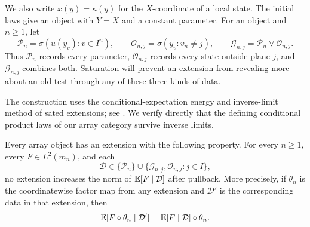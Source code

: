 We also write $x(y)=\kappa(y)$ for the $X$-coordinate of a local state.
The initial laws give an object with $Y=X$ and a constant parameter.
For an object and $n\geq1$, let
\[
 \mathcal P_n=\sigma(u(y_v):v\in I^n),\qquad
 \mathcal O_{n,j}=\sigma(y_v:v_n\ne j),\qquad
 \mathcal G_{n,j}=\mathcal P_n\vee\mathcal O_{n,j}.
\]
Thus $\mathcal P_n$ records every parameter, $\mathcal O_{n,j}$ records
every state outside plane $j$, and $\mathcal G_{n,j}$ combines both.
Saturation will prevent an extension from revealing more about an old
test through any of these three kinds of data.

The construction uses the conditional-expectation energy and inverse-limit
method of sated extensions; see
\cite[preprint version, proof of Theorem~3.11 and Lemma~3.12]{Austin2015Sated}.
We verify directly that the defining conditional product laws of our
array category survive inverse limits.

\begin{proposition}[Saturation]\label{prop:saturation}
Every array object has an extension with the following property.  For
every $n\geq1$, every $F\in L^2(m_n)$, and each
\[
 \mathcal D\in\{\mathcal P_n\}\cup
 \{\mathcal G_{n,j},\mathcal O_{n,j}:j\in I\},
\]
no extension increases the norm of $\mathbb E[F\mid\mathcal D]$ after
pullback.  More precisely, if $\theta_n$ is the coordinatewise factor
map from any extension and $\mathcal D'$ is the corresponding data in
that extension, then
\begin{equation}\label{eq:saturation-equality}
 \mathbb E[F\circ\theta_n\mid\mathcal D']
 =\mathbb E[F\mid\mathcal D]\circ\theta_n.
\end{equation}
\end{proposition}

